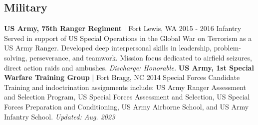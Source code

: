 \documentclass{article}
\begin{document}
\begin{bgbox}[
        height = \paperheight,
        width = 0.69\textwidth,
        colback = white
    ]
{            \section*{Military}
                \textbf{US Army, 75th Ranger Regiment} | Fort Lewis, WA \hfill{2015 - 2016}\newline
                        Infantry\newline\newline
                            Served in support of US Special Operations in the Global War on Terrorism as a US Army Ranger. Developed deep interpersonal skills in leadership, problem-solving, perseverance, and teamwork. Mission focus dedicated to airfield seizures, direct action raids and ambushes. \textit{Discharge: Honorable.}\newline\newline
                \textbf{US Army, 1st Special Warfare Training Group} | Fort Bragg, NC \hfill{2014}\newline
                        Special Forces Candidate\newline\newline
                            Training and indoctrination assignments include: US Army Ranger Assessment and Selection Program, US Special Forces Assessment and Selection, US Special Forces Preparation and Conditioning, US Army Airborne School, and US Army Infantry School.\newline
            \mbox{}
            \vfill
            \hfill{}\textit{Updated: Aug. 2023}
    }
    \end{bgbox}
\end{document}
